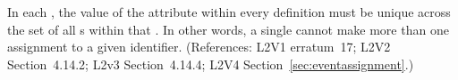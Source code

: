 In each \Event, the value of the  attribute
within every \EventAssignment definition must be unique across the set of
all \EventAssignment{}s within that \Event.  In other words, a
single \Event cannot make more than one assignment to a given
identifier.  (References: L2V1 erratum~17; L2V2 Section~4.14.2;
L2v3 Section~4.14.4; L2V4 Section~\ref{sec:eventassignment}.)
